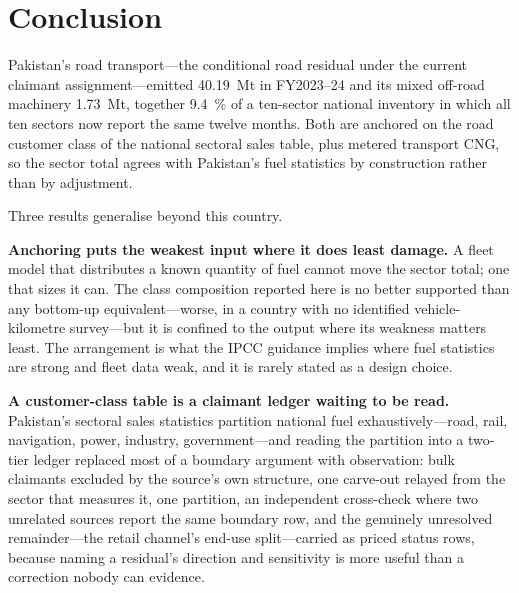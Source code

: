 \section{Conclusion}
\label{sec:conclusion}

Pakistan's road transport---the conditional road residual under the current claimant
assignment---emitted \SI{40.19}{\mega\tonne} \COe{} in FY2023--24 and its mixed off-road
machinery \SI{1.73}{\mega\tonne}, together \SI{9.4}{\percent} of a ten-sector national
inventory in which all ten sectors now report the same twelve months. Both are
anchored on the road customer class of the national sectoral sales table, plus metered
transport CNG, so the sector total agrees with Pakistan's fuel statistics by construction
rather than by adjustment.

Three results generalise beyond this country.

\textbf{Anchoring puts the weakest input where it does least damage.} A fleet model that
distributes a known quantity of fuel cannot move the sector total; one that sizes it can. The
class composition reported here is no better supported than any bottom-up equivalent---worse,
in a country with no identified vehicle-kilometre survey---but it is confined to the output
where its weakness matters least. The arrangement is what the IPCC guidance implies where fuel
statistics are strong and fleet data weak, and it is rarely stated as a design choice.

\textbf{A customer-class table is a claimant ledger waiting to be read.} Pakistan's
sectoral sales statistics partition national fuel exhaustively---road, rail, navigation,
power, industry, government---and reading the partition into a two-tier ledger replaced
most of a boundary argument with observation: bulk claimants excluded by the source's own
structure, one carve-out relayed from the sector that measures it, one partition, an
independent cross-check where two unrelated sources report the same boundary row, and the
genuinely unresolved remainder---the retail channel's end-use split---carried as priced
status rows, because naming a residual's direction and sensitivity is more useful than a
correction nobody can evidence.

